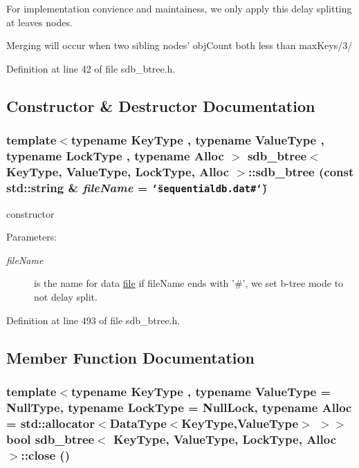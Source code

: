 For implementation convience and maintainess, we only apply this delay splitting at leaves nodes.

Merging will occur when two sibling nodes' objCount both less than maxKeys/3/ 

Definition at line 42 of file sdb\_\-btree.h.

\subsection{Constructor \& Destructor Documentation}
\hypertarget{classsdb__btree_ae55c86e49f1ff7c02f4251ccfe8c625}{
\subsubsection[{sdb\_\-btree}]{\setlength{\rightskip}{0pt plus 5cm}template$<$typename KeyType , typename ValueType , typename LockType , typename Alloc $>$ {\bf sdb\_\-btree}$<$ KeyType, ValueType, LockType, Alloc $>$::{\bf sdb\_\-btree} (const std::string \& {\em fileName} = {\tt \char`\"{}sequentialdb.dat\#\char`\"{}})}}
\label{classsdb__btree_ae55c86e49f1ff7c02f4251ccfe8c625}


constructor 

\begin{Desc}
\item[Parameters:]
\begin{description}
\item[{\em fileName}]is the name for data \hyperlink{classfile}{file} if fileName ends with '\#', we set b-tree mode to not delay split. \end{description}
\end{Desc}


Definition at line 493 of file sdb\_\-btree.h.

\subsection{Member Function Documentation}
\hypertarget{classsdb__btree_2da914c45fec1081667fb22d42a021a5}{
\subsubsection[{close}]{\setlength{\rightskip}{0pt plus 5cm}template$<$typename KeyType , typename ValueType  = NullType, typename LockType  = NullLock, typename Alloc  = std::allocator$<$DataType$<$KeyType,ValueType$>$ $>$$>$ bool {\bf sdb\_\-btree}$<$ KeyType, ValueType, LockType, Alloc $>$::close ()}}
\label{classsdb__btree_2da914c45fec1081667fb22d42a021a5}


